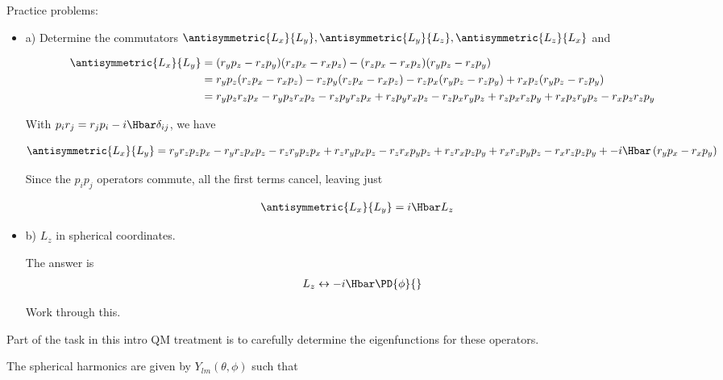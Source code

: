 Practice problems:
\begin{itemize}
\item a) Determine the commutators $\antisymmetric{L_x}{L_y}, \antisymmetric{L_y}{L_z}, \antisymmetric{L_z}{L_x}$ and

\begin{align*}
\antisymmetric{L_x}{L_y}
&=
(r_y p_z -r_z p_y)
(r_z p_x -r_x p_z)
-
(r_z p_x -r_x p_z)
(r_y p_z -r_z p_y) \\
&=
r_y p_z (r_z p_x -r_x p_z)
-r_z p_y (r_z p_x -r_x p_z)
- r_z p_x (r_y p_z -r_z p_y)
+ r_x p_z (r_y p_z -r_z p_y) \\
&=
r_y p_z r_z p_x
-r_y p_z r_x p_z
-r_z p_y r_z p_x
+r_z p_y r_x p_z
- r_z p_x r_y p_z
+ r_z p_x r_z p_y
+ r_x p_z r_y p_z
- r_x p_z r_z p_y \\
\end{align*}

With $p_i r_j = r_j p_i - i \Hbar \delta_{ij}$, we have

\begin{dmath*}
\antisymmetric{L_x}{L_y}
=
r_y r_z p_z p_x
-r_y r_z p_x p_z
-r_z r_y p_z p_x
+r_z r_y p_x p_z
- r_z r_x p_y p_z
+ r_z r_x p_z p_y
+ r_x r_z p_y p_z
- r_x r_z p_z p_y 
+
-i \Hbar
\left(
r_y p_x
- r_x p_y
\right)
\end{dmath*}

Since the $p_i p_j$ operators commute, all the first terms cancel, leaving just

\begin{align*}
\antisymmetric{L_x}{L_y}
&=i \Hbar L_z
\end{align*}


\item b) $L_z$ in spherical coordinates.

The answer is
\begin{align}\label{eqn:PHY356Foct19:1003}
L_z \leftrightarrow -i \Hbar \PD{\phi}{}
\end{align}

Work through this.
\end{itemize}

Part of the task in this intro QM treatment is to carefully determine the eigenfunctions for these operators.

The spherical harmonics are given by $Y_{lm}(\theta, \phi)$ such that

